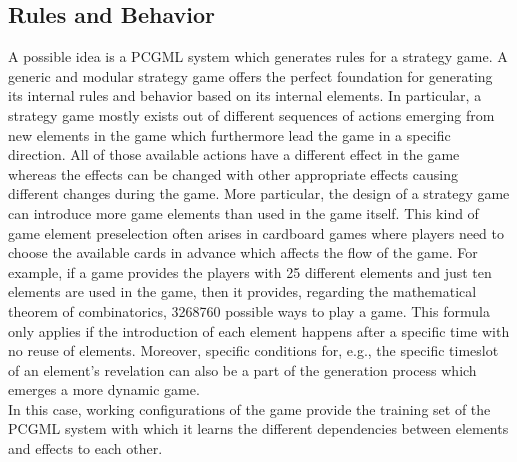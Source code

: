 \documentclass[MGS,Master,english]{twbook}%
\begin{document}
\subsection{Rules and Behavior} \label{idea::rulesAndBehavior}
A possible idea is a PCGML system which generates rules for a strategy game. A generic and modular strategy game offers the perfect foundation for generating its internal rules and behavior based on its internal elements. In particular, a strategy game mostly exists out of different sequences of actions emerging from new elements in the game which furthermore lead the game in a specific direction. All of those available actions have a different effect in the game whereas the effects can be changed with other appropriate effects causing different changes during the game. More particular, the design of a strategy game can introduce more game elements than used in the game itself. This kind of game element preselection often arises in cardboard games where players need to choose the available cards in advance which affects the flow of the game. For example, if a game provides the players with 25 different elements and just ten elements are used in the game, then it provides, regarding the mathematical theorem of combinatorics, 3268760 possible ways to play a game. This formula only applies if the introduction of each element happens after a specific time with no reuse of elements. Moreover, specific conditions for, e.g., the specific timeslot of an element's revelation can also be a part of the generation process which emerges a more dynamic game.\\
In this case, working configurations of the game provide the training set of the PCGML system with which it learns the different dependencies between elements and effects to each other. 

\end{document}
